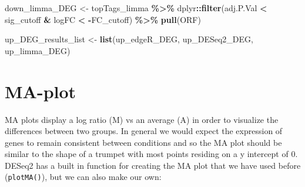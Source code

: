 \documentclass[
]{book}
\newenvironment{Shaded}{\begin{snugshade}}{\end{snugshade}}
\newcommand{\FunctionTok}[1]{\textcolor[rgb]{0.13,0.29,0.53}{\textbf{#1}}}
\newcommand{\NormalTok}[1]{#1}
\newcommand{\OtherTok}[1]{\textcolor[rgb]{0.56,0.35,0.01}{#1}}
\newcommand{\SpecialCharTok}[1]{\textcolor[rgb]{0.81,0.36,0.00}{\textbf{#1}}}
\begin{document}
\begin{Shaded}
\begin{Highlighting}[]
\NormalTok{down\_limma\_DEG }\OtherTok{\textless{}{-}}\NormalTok{ topTags\_limma }\SpecialCharTok{\%\textgreater{}\%}
\NormalTok{  dplyr}\SpecialCharTok{::}\FunctionTok{filter}\NormalTok{(adj.P.Val }\SpecialCharTok{\textless{}}\NormalTok{ sig\_cutoff }\SpecialCharTok{\&}\NormalTok{ logFC }\SpecialCharTok{\textless{}} \SpecialCharTok{{-}}\NormalTok{FC\_cutoff) }\SpecialCharTok{\%\textgreater{}\%}
  \FunctionTok{pull}\NormalTok{(ORF)}

\NormalTok{up\_DEG\_results\_list }\OtherTok{\textless{}{-}} \FunctionTok{list}\NormalTok{(up\_edgeR\_DEG,}
\NormalTok{                        up\_DESeq2\_DEG,}
\NormalTok{                        up\_limma\_DEG)}
\end{Highlighting}
\end{Shaded}

\hypertarget{ma-plot}{%
\section{MA-plot}\label{ma-plot}}

MA plots display a log ratio (M) vs an average (A) in order to visualize the differences between two groups. In general we would expect the expression of genes to remain consistent between conditions and so the MA plot should be similar to the shape of a trumpet with most points residing on a y intercept of 0. DESeq2 has a built in function for creating the MA plot that we have used before (\texttt{plotMA()}), but we can also make our own:
\end{document}

